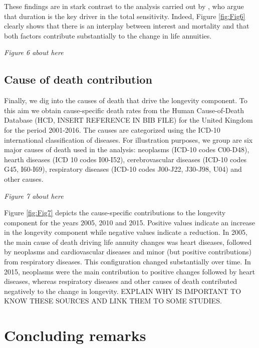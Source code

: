 \documentclass[12pt]{article}
\begin{document}
These findings are in stark contrast to the analysis carried out by \citet{rabitti2020mortality}, who argue that duration is the key driver in the total sensitivity. Indeed, Figure \ref{fig:Fig6} clearly shows that there is an interplay between interest and mortality and that both factors contribute substantially to the change in life annuities. 

\begin{center}
	\textit{Figure 6 about here}
\end{center}

\subsection{Cause of death contribution}

Finally, we dig into the causes of death that drive the longevity component. To this aim we obtain cause-specific death rates from the Human Cause-of-Death Database (HCD, INSERT REFERENCE IN BIB FILE) for the United Kingdom for the period 2001-2016. The causes are categorized using the ICD-10 international classification of diseases. For illustration purposes, we group  are six major causes of death used in the analysis: neoplasms (ICD-10 codes C00-D48), hearth diseases (ICD 10 codes I00-I52), cerebrovascular diseases (ICD-10 codes G45, I60-I69), respiratory diseases (ICD-10 codes J00-J22, J30-J98, U04) and other causes.

\begin{center}
	\textit{Figure 7 about here}
\end{center}

Figure \ref{fig:Fig7} depicts the cause-specific contributions to the longevity component for the years 2005, 2010 and 2015. Positive values indicate an increase in the longevity component while negative values indicate a reduction. In 2005, the main cause of death driving life annuity changes was heart diseases, followed by neoplasms and cardiovascular diseases and minor (but positive contributions) from respiratory diseases. This configuration changed substantially over time. In 2015, neoplasms were the main contribution to positive changes followed by heart diseases, whereas respiratory diseases and other causes of death contributed negatively to the change in longevity. EXPLAIN WHY IS IMPORTANT TO KNOW THESE SOURCES AND LINK THEM TO SOME STUDIES.


\section{Concluding remarks}\label{sec:6_Conclusion}
\end{document}
